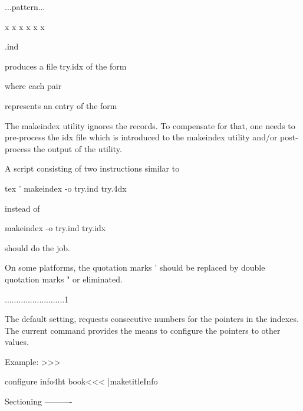 {{{{\begin{tabular / array}{...pattern...}
\begin{...}
         x
         x
         x
         x
         x
         x
       
        \jobname.ind
       
       
    
    produces a file try.idx of the form
    
    
    where each pair 
    
    
    represents an entry of the form 
    
          
    The makeindex utility ignores the \beforeentry records.  To compensate
    for that, one needs to pre-process the idx file which is introduced to
    the makeindex utility and/or post-process the output of the utility.

    A script consisting of two instructions similar to

      tex '\def\filename{{try}{idx}{4dx}{ind}} 
      makeindex -o try.ind try.4dx

    instead of

      makeindex -o try.ind try.idx

    should do the job.

    On some platforms, the quotation marks ' should be
    replaced by double quotation marks " or eliminated.

 ..........................1

    The default setting, requests consecutive numbers for the
    pointers in the indexes.  The current command provides the
    means to configure the pointers to other values.

    Example: 
>>>



  
\<configure info4ht book\><<<
|maketitleInfo

Sectioning
----------


\end{...}
\end{tabular / array}}}}}
